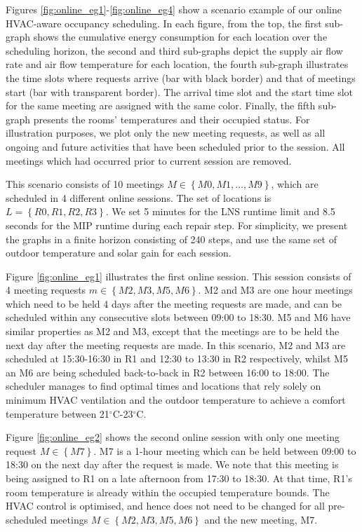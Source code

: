 Figures \ref{fig:online_eg1}-\ref{fig:online_eg4} show a scenario example of our online HVAC-aware occupancy scheduling. In each figure, from the top, the first sub-graph shows the cumulative energy consumption for each location over the scheduling horizon, the second and third sub-graphs depict the supply air flow rate and air flow temperature for each location, 
the fourth sub-graph illustrates the time slots where requests arrive (bar with black border) and that of meetings start (bar with transparent border). The arrival time slot and the start time slot for the same meeting are assigned with the same color. 
Finally, the fifth sub-graph presents the rooms' temperatures and their occupied status.
For illustration purposes, we plot only the new meeting requests, as well as all ongoing and future activities that have been scheduled prior to the session. All meetings which had occurred prior to current session are removed. 

This scenario consists of 10 meetings $M \in \left\{M0, M1,\ldots, M9\right\}$, which are scheduled in 4 different online sessions. The set of locations is $L = \left\{R0, R1, R2, R3\right\}$. We set 5 minutes for the LNS runtime limit and 8.5 seconds for the MIP runtime during each repair step. For simplicity, we present the graphs in a finite horizon consisting of 240 steps, and use the same set of outdoor temperature and solar gain for each session.

Figure \ref{fig:online_eg1} illustrates the first online session. This session consists of 4 meeting requests $m \in \left\{M2, M3, M5, M6\right\}$. M2 and M3 are one hour meetings which need to be held 4 days after the meeting requests are made, and can be scheduled within any consecutive slots between 09:00 to 18:30. M5 and M6 have similar properties as M2 and M3, except that the meetings are to be held the next day after the meeting requests are made. In this scenario, M2 and M3 are scheduled at 15:30-16:30 in R1 and 12:30 to 13:30 in R2 respectively, whilst M5 an M6 are being scheduled back-to-back in R2 between 16:00 to 18:00.
The scheduler manages to find optimal times and locations that rely solely on minimum HVAC ventilation and the outdoor temperature to achieve a comfort temperature between 21$^\circ$C-23$^\circ$C.

Figure \ref{fig:online_eg2} shows the second online session with only one meeting request $M \in \left\{M7\right\}$. M7 is a 1-hour meeting which can be held between 09:00 to 18:30 on the next day after the request is made. We note that this meeting is being assigned to R1 on a late afternoon from 17:30 to 18:30. At that time, R1's room temperature is already within the occupied temperature bounds. The HVAC control is optimised, and hence does not need to be changed for all pre-scheduled meetings  $M \in \left\{M2, M3, M5, M6\right\}$ and the new meeting, M7.


